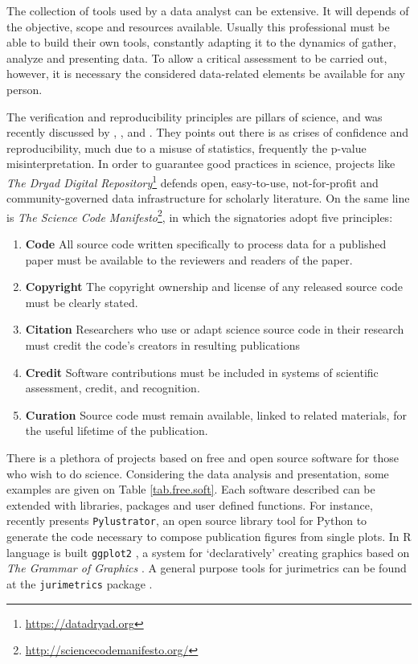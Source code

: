 \documentclass[a4paper]{exam}
\theoremstyle{plain}
\begin{document}
The collection of tools used by a data analyst can be extensive. It will depends of the objective, scope and resources available. Usually this professional must be able to build their own tools, constantly adapting it to the dynamics of gather, analyze and presenting data. To allow a critical assessment to be carried out, however, it is necessary the considered data-related elements be available for any person.

The verification and reproducibility principles are pillars of science, and was recently discussed by \cite{pashler2012editors}, \cite{baker2016why}, \cite{munafo2017manifesto} and \cite{wasserstein2019moving}. They points out there is as crises of confidence and reproducibility, much due to a misuse of statistics, frequently the p-value misinterpretation. In order to guarantee good practices in science, projects like \textit{The Dryad Digital Repository}\footnote{ \url{https://datadryad.org}} defends open, easy-to-use, not-for-profit and community-governed data infrastructure for scholarly literature. On the same line is \textit{The Science Code Manifesto}\footnote{ \url{http://sciencecodemanifesto.org/}}, in which the signatories adopt five principles:

\begin{enumerate}
  \item \textbf{Code} All source code written specifically to process data for a published paper must be available to the reviewers and readers of the paper.
  \item \textbf{Copyright} The copyright ownership and license of any released source code must be clearly stated.
  \item \textbf{Citation} Researchers who use or adapt science source code in their research must credit the code’s creators in resulting publications
  \item \textbf{Credit} Software contributions must be included in systems of scientific assessment, credit, and recognition.
  \item \textbf{Curation} Source code must remain available, linked to related materials, for the useful lifetime of the publication.
\end{enumerate}

There is a plethora of projects based on free and open source software for those who wish to do science. Considering the data analysis and presentation, some examples are given on Table \ref{tab.free.soft}. Each software described can be extended with libraries, packages and user defined functions. For instance, recently \cite{gerum2019pylustrator} presents \texttt{Pylustrator}, an open source library tool for Python to generate the code necessary to compose publication figures from single plots. In R language \cite{r2019r} is built \texttt{ggplot2} \cite{wickham2016ggplot2}, a system for `declaratively' creating graphics based on \textit{The Grammar of Graphics} \cite{wilkinson2005grammar}. A general purpose tools for jurimetrics can be found at the \texttt{jurimetrics} package \cite{zabala2019jurimetrics}.
\end{document}
